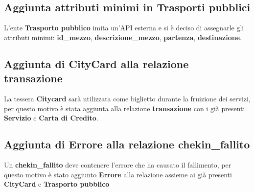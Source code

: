 \subsection{Aggiunta attributi minimi in Trasporti pubblici}
L'ente \textbf{Trasporto pubblico} imita un'API esterna e si è deciso di assegnarle gli attributi minimi: \textbf{id{\_}mezzo}, \textbf{descrizione{\_}mezzo}, \textbf{partenza}, \textbf{destinazione}.

\subsection{Aggiunta di \textbf{CityCard} alla relazione \textbf{transazione}}
La tessera \textbf{Citycard} sarà utilizzata come biglietto durante la fruizione dei servizi, per questo motivo è stata aggiunta alla relazione \textbf{transazione} con i già presenti \textbf{Servizio} e \textbf{Carta di Credito}.

\subsection{Aggiunta di \textbf{Errore} alla relazione \textbf{chekin{\_}fallito}}
Un \textbf{chekin{\_}fallito} deve contenere l'errore che ha causato il fallimento, per questo motivo è stato aggiunto \textbf{Errore} alla relazione assieme ai già presenti \textbf{CityCard} e \textbf{Trasporto pubblico}